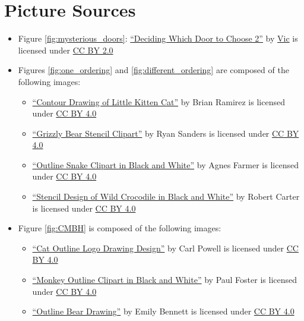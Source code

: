 \documentclass[hidelinks]{scrartcl}
\begin{document}
\newpage
\section{Picture Sources}
\begin{itemize}
\item Figure \ref{fig:mysterious_doors}: \href{https://flic.kr/p/aQUzkH}{``Deciding Which Door to Choose 2''} by \href{https://www.flickr.com/photos/59632563@N04/}{Vic} is licensed under \href{https://creativecommons.org/licenses/by/2.0/}{CC BY 2.0}
\item Figures \ref{fig:one_ordering} and \ref{fig:different_ordering} are composed of the following images:
	\begin{itemize}
	\item \href{http://animalsclipart.com/contour-drawing-of-little-kitten-cat/}{``Contour Drawing of Little Kitten Cat''} by Brian Ramirez is licensed under \href{https://creativecommons.org/licenses/by/4.0/}{CC BY 4.0}
	\item \href{http://animalsclipart.com/grizzly-bear-stencil-clipart/}{``Grizzly Bear Stencil Clipart''} by Ryan Sanders is licensed under \href{https://creativecommons.org/licenses/by/4.0/}{CC BY 4.0}
	\item \href{http://animalsclipart.com/outline-snake-clipart-in-black-and-white/}{``Outline Snake Clipart in Black and White''} by Agnes Farmer is licensed under \href{https://creativecommons.org/licenses/by/4.0/}{CC BY 4.0}
	\item \href{http://animalsclipart.com/stencil-design-of-wild-crocodile-in-black-and-white/}{``Stencil Design of Wild Crocodile in Black and White''} by Robert Carter is licensed under \href{https://creativecommons.org/licenses/by/4.0/}{CC BY 4.0}
	\end{itemize}
\item Figure \ref{fig:CMBH} is composed of the following images:
	\begin{itemize}
	\item \href{http://animalsclipart.com/cat-outline-logo-drawing-design/}{``Cat Outline Logo Drawing Design''} by Carl Powell is licensed under \href{https://creativecommons.org/licenses/by/4.0/}{CC BY 4.0}
	\item \href{http://animalsclipart.com/monkey-outline-clipart-in-black-and-white/}{``Monkey Outline Clipart in Black and White''} by Paul Foster is licensed under \href{https://creativecommons.org/licenses/by/4.0/}{CC BY 4.0}
	\item \href{http://animalsclipart.com/outline-bear-drawing/}{``Outline Bear Drawing''} by Emily Bennett is licensed under \href{https://creativecommons.org/licenses/by/4.0/}{CC BY 4.0}

\end{itemize}
\end{itemize}
\end{document}
